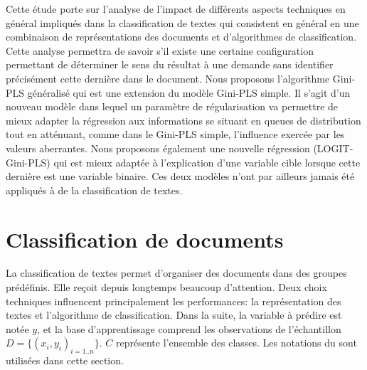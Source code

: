 Cette étude porte sur l'analyse de l'impact de différents aspects techniques en général impliqués dans la classification de textes qui consistent en général en une combinaison de représentations des documents et d'algorithmes de classification. Cette analyse permettra de savoir s'il existe une certaine configuration permettant de déterminer le sens du résultat à une demande sans identifier précisément cette dernière dans le document. Nous proposons l'algorithme Gini-PLS généralisé qui est une extension du modèle Gini-PLS simple. Il s'agit d'un nouveau modèle dans lequel un paramètre de régularisation va permettre de mieux adapter la régression aux informations se situant en queues de distribution tout en atténuant, comme dans le Gini-PLS simple, l'influence exercée par les valeurs aberrantes. Nous proposons également une nouvelle régression (LOGIT-Gini-PLS) qui est mieux adaptée à l'explication d'une variable cible lorsque cette dernière est une variable binaire. Ces deux modèles n'ont par ailleurs jamais été appliqués à de la classification de textes.


\section{Classification de documents}
\label{sec:sensresultat:biblio_classif}

La classification de textes permet d'organiser des documents dans des groupes prédéfinis. Elle reçoit depuis longtemps beaucoup d'attention. Deux choix techniques influencent principalement les performances: la représentation des textes et l'algorithme de classification. Dans la suite, la variable à prédire est notée $y$, et la base d'apprentissage comprend les observations de l'échantillon $D = \lbrace (x_i, y_i)_{i=1..n} \rbrace$. $C$ représente l'ensemble des classes.  Les notations du  sont utilisées dans cette section.

